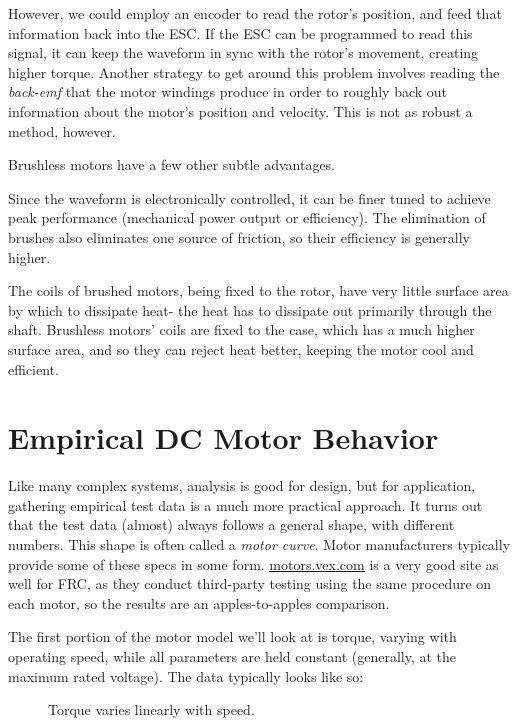 However, we could employ an encoder to read the rotor's position, and feed that information back into the ESC. If the ESC can be programmed to read this signal, it can keep the waveform in sync with the rotor's movement, creating higher torque. Another strategy to get around this problem involves reading the \textit{back-emf} that the motor windings produce in order to roughly back out information about the motor's position and velocity. This is not as robust a method, however.

Brushless motors have a few other subtle advantages.

Since the waveform is electronically controlled, it can be finer tuned to achieve peak performance (mechanical power output or efficiency). The elimination of brushes also eliminates one source of friction, so their efficiency is generally higher.

The coils of brushed motors, being fixed to the rotor, have very little surface area by which to dissipate heat- the heat has to dissipate out primarily through the shaft. Brushless motors' coils are fixed to the case, which has a much higher surface area, and so they can reject heat better, keeping the motor cool and efficient.

\newpage
\section{Empirical DC Motor Behavior}
Like many complex systems, analysis is good for design, but for application, gathering empirical test data is a much more practical approach. It turns out that the test data (almost) always follows a general shape, with different numbers. This shape is often called a \textit{motor curve}. Motor manufacturers typically provide some of these specs in some form. \href{http://motors.vex.com}{\color{red}\underline{motors.vex.com}} is a very good site as well for FRC, as they conduct third-party testing using the same procedure on each motor, so the results are an apples-to-apples comparison.


The first portion of the motor model we'll look at is torque, varying with operating speed, while all parameters are held constant (generally, at the maximum rated voltage). The data typically looks like so:

\begin{figure}[H] \centering \label{fig:motor_torque_curve}
\caption{Torque varies linearly with speed.}
\end{figure}

